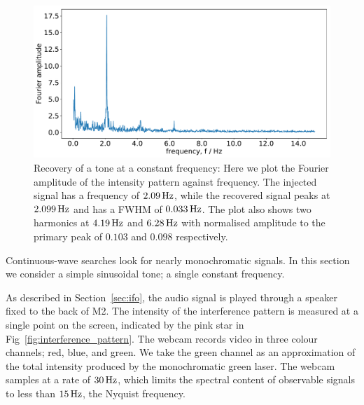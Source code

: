 \documentclass[paper-main.tex]{subfiles}
\begin{document}
\begin{figure}
	\includegraphics[width=.49\textwidth]{figures/webcam_expt_4_0209-cropped.pdf}
	\caption{\label{fig:webcam_spectrum}
Recovery of a tone at a constant frequency: Here we plot the Fourier amplitude of the intensity pattern against frequency.
The injected signal has a frequency of $2.09\,{\rm Hz}$, while the recovered signal peaks at $2.099\,{\rm Hz}$ and has a FWHM of $0.033\,{\rm Hz}$.
The plot also shows two harmonics at $4.19\,{\rm Hz}$ and $6.28\,{\rm Hz}$ with normalised amplitude to the primary peak of $0.103$ and $0.098$ respectively.
}	
\end{figure}


Continuous-wave searches look for nearly monochromatic signals. In this section we consider a simple sinusoidal tone; a single constant frequency.

As described in Section~\ref{sec:ifo}, the audio signal is played through a speaker fixed to the back of M2. 
The intensity of the interference pattern is measured at a single point on the screen, indicated by the pink star in Fig~\ref{fig:interference_pattern}. 
The webcam records video in three colour channels; red, blue, and green. 
We take the green channel as an approximation of the total intensity produced by the monochromatic green laser.
The webcam samples at a rate of $30\, {\rm Hz}$, which limits the spectral content of observable signals to less than $15\,{\rm Hz}$, the Nyquist frequency. 


\end{document}
